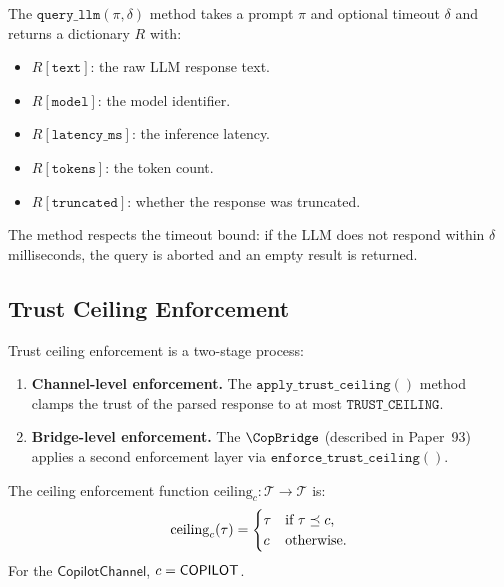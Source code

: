 \documentclass[11pt]{article}
\newcommand{\CopChan}{\mathsf{CopilotChannel}}
\newcommand{\TrustCeil}{\mathrm{ceiling}}
\newcommand{\CopQuery}{\texttt{query\_llm}}
\begin{document}
\begin{definition}
\label{def:query-spec}
The $\CopQuery(\pi, \delta)$ method takes a prompt $\pi$ and
optional timeout $\delta$ and returns a dictionary $R$ with:
\begin{itemize}[leftmargin=2em]
\item $R[\texttt{text}]$: the raw LLM response text.
\item $R[\texttt{model}]$: the model identifier.
\item $R[\texttt{latency\_ms}]$: the inference latency.
\item $R[\texttt{tokens}]$: the token count.
\item $R[\texttt{truncated}]$: whether the response was truncated.
\end{itemize}
The method respects the timeout bound: if the LLM does not respond
within $\delta$ milliseconds, the query is aborted and an empty
result is returned.
\end{definition}

\subsection{Trust Ceiling Enforcement}
\label{sec:impl:ceiling}

Trust ceiling enforcement is a two-stage process:

\begin{enumerate}
\item \textbf{Channel-level enforcement.}  The
  $\texttt{apply\_trust\_ceiling}()$ method clamps the trust of
  the parsed response to at most $\texttt{TRUST\_CEILING}$.

\item \textbf{Bridge-level enforcement.}  The $\CopBridge$
  (described in Paper~93) applies a second enforcement layer
  via $\texttt{enforce\_trust\_ceiling}()$.
\end{enumerate}

\begin{definition}
\label{def:enforce}
The ceiling enforcement function
$\TrustCeil_c : \mathcal{T} \to \mathcal{T}$ is:
\[
  \TrustCeil_c(\tau) = \begin{cases}
    \tau & \text{if } \tau \tleq c, \\
    c & \text{otherwise.}
  \end{cases}
\]
For the $\CopChan$, $c = \mathsf{COPILOT}$.
\end{definition}
\end{document}
